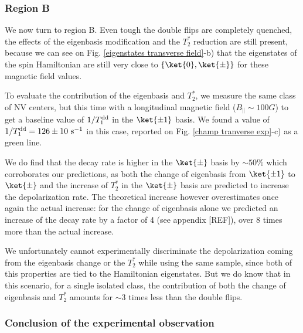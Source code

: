 \documentclass[a4paper,11pt]{report}
\begin{document}
\begin{refsection}
\subsubsection{Region B}

We now turn to region B. Even tough the double flips are completely quenched, the effects of the eigenbasis modification and the $T_2^*$ reduction are still present, because we can see on Fig. \ref{eigenstates transverse field}-b) that the eigenstates of the spin Hamiltonian are still very close to $\{ \ket{0}, \ket{\pm} \}$ for these magnetic field values.

To evaluate the contribution of the eigenbasis and $T_2^*$, we measure the same class of NV centers, but this time with a longitudinal magnetic field ($B_\parallel \sim 100 G$) to get a baseline value of $1/T_1^{\rm dd}$ in the $\ket{\pm 1}$ basis. We found a value of $1/T_1^{\rm dd}=126 \pm 10\ \rm s^{-1}$ in this case, reported on Fig. \ref{champ tranverse exp}-c) as a green line. 

We do find that the decay rate is higher in the $\ket{\pm}$ basis by $\sim 50\% $ which corroborates our predictions, as both the change of eigenbasis from $\ket{\pm 1}$ to $\ket{\pm}$ and the increase of $T_2^*$ in the $\ket{\pm}$ basis are predicted to increase the depolarization rate. The theoretical increase however overestimates once again the actual increase: for the change of eigenbasis alone we predicted an increase of the decay rate by a factor of 4 (see appendix [REF]), over 8 times more than the actual increase.

We unfortunately cannot experimentally discriminate the depolarization coming from the eigenbasis change or the $T_2^*$ while using the same sample, since both of this properties are tied to the Hamiltonian eigenstates. But we do know that in this scenario, for a single isolated class, the contribution of both the change of eigenbasis and $T_2^*$ amounts for $\sim 3$ times less than the double flips. 

\subsubsection{Conclusion of the experimental observation}


\end{refsection}
\end{document}
